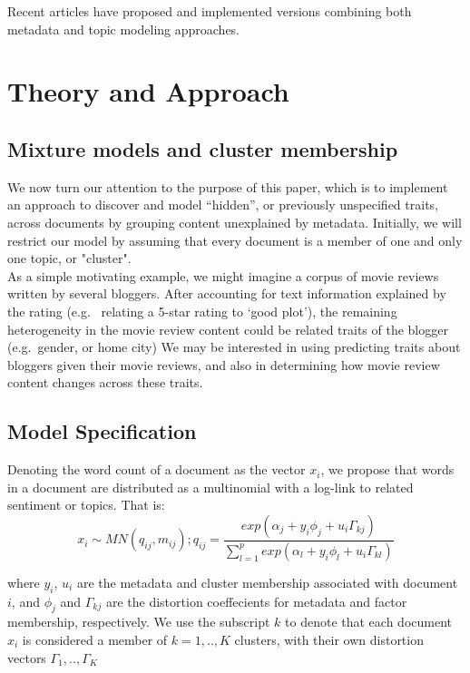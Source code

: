 \documentclass[12pt]{article}
\begin{document}
Recent articles have proposed and implemented versions combining both
metadata and topic modeling approaches.

\section{Theory and Approach}\label{theory-and-approach}

\subsection{Mixture models and cluster
membership}\label{mixture-models-and-cluster-membership}

We now turn our attention to the purpose of this paper, which is to
implement an approach to discover and model ``hidden'', or previously
unspecified traits, across documents by grouping content unexplained by
metadata. Initially, we will restrict our model by assuming that every document is a member of one and only one topic, or "cluster". 
\\As a simple motivating example, we might imagine a corpus of
movie reviews written by several bloggers. After accounting for text
information explained by the rating (e.g. ~relating a 5-star rating to
`good plot'), the remaining heterogeneity in the movie review
content could be related traits of the blogger (e.g.~gender, or home
city) We may be interested in using predicting traits about bloggers
given their movie reviews, and also in determining how movie review
content changes across these traits.

\subsection{Model Specification}\label{model-specification}

Denoting the word count of a document as the vector $x_i$, we propose
that words in a document are distributed as a multinomial with a
log-link to related sentiment or topics. That is:
\[ x_{i} \sim MN(q_{ij},m_{ij}) ; q_{ij} = \frac{exp(\alpha_j + y_i \phi_j + u_i \Gamma_{kj})}{\sum_{l=1}^{p}{exp(\alpha_l+ y_i \phi_l + u_i \Gamma_{kl})}}\]

where $y_i$, $u_i$ are the metadata and cluster membership associated
with document $i$, and $\phi_j$ and $\Gamma_{kj}$ are the distortion
coeffecients for metadata and factor membership, respectively. We use
the subscript $k$ to denote that each document $x_i$ is considered a
member of $k = 1,..,K$ clusters, with their own distortion vectors
$\Gamma_1,..,\Gamma_K$
\end{document}
